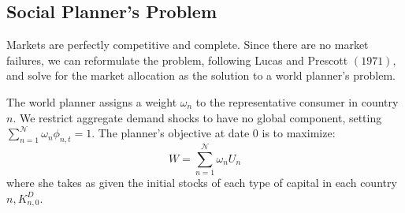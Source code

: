 \documentclass[12pt, bibtotoc, tablecaptionabove, figurecaptionabove, fleqn]{article}
\begin{document}
\subsection{Social Planner's Problem}
Markets are perfectly competitive and complete. Since there are no market failures, we can reformulate the problem, following Lucas and Prescott $(1971),$ and solve for the market allocation as the solution to a world planner's problem.

The world planner assigns a weight $\omega_{n}$ to the representative consumer in country $n$. We restrict aggregate demand shocks to have no global component, setting $\sum_{n=1}^{\mathcal{N}} \omega_{n} \phi_{n, t}=1$. The planner's objective at date 0 is to maximize:
\begin{equation*}
	W=\sum_{n=1}^{\mathcal{N}} \omega_{n} U_{n}
\end{equation*}
where she takes as given the initial stocks of each type of capital in each country $n, K_{n,0}^{D}$.
\end{document}
